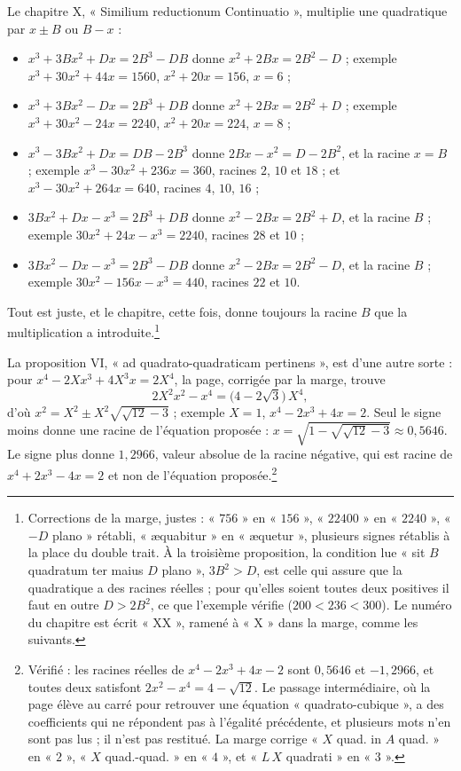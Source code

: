 \documentclass[11pt,a4paper]{article}
\begin{document}
Le chapitre X, « Similium reductionum Continuatio », multiplie une quadratique
par $x \pm B$ ou $B - x$ :
\begin{itemize}
  \item $x^3 + 3Bx^2 + Dx = 2B^3 - DB$ donne $x^2 + 2Bx = 2B^2 - D$ ; exemple
    $x^3 + 30x^2 + 44x = 1560$, $x^2 + 20x = 156$, $x = 6$ ;
  \item $x^3 + 3Bx^2 - Dx = 2B^3 + DB$ donne $x^2 + 2Bx = 2B^2 + D$ ; exemple
    $x^3 + 30x^2 - 24x = 2240$, $x^2 + 20x = 224$, $x = 8$ ;
  \item $x^3 - 3Bx^2 + Dx = DB - 2B^3$ donne $2Bx - x^2 = D - 2B^2$, et la racine
    $x = B$ ; exemple $x^3 - 30x^2 + 236x = 360$, racines $2$, $10$ et $18$ ; et
    $x^3 - 30x^2 + 264x = 640$, racines $4$, $10$, $16$ ;
  \item $3Bx^2 + Dx - x^3 = 2B^3 + DB$ donne $x^2 - 2Bx = 2B^2 + D$, et la racine
    $B$ ; exemple $30x^2 + 24x - x^3 = 2240$, racines $28$ et $10$ ;
  \item $3Bx^2 - Dx - x^3 = 2B^3 - DB$ donne $x^2 - 2Bx = 2B^2 - D$, et la racine
    $B$ ; exemple $30x^2 - 156x - x^3 = 440$, racines $22$ et $10$.
\end{itemize}
Tout est juste, et le chapitre, cette fois, donne toujours la racine $B$ que la
multiplication a introduite.\footnote{Corrections de la marge, justes : « $756$ »
en « $156$ », « $22400$ » en « $2240$ », « $- D$ plano » rétabli, « æquabitur » en
« æquetur », plusieurs signes rétablis à la place du double trait. À la troisième
proposition, la condition lue « sit $B$ quadratum ter maius $D$ plano »,
$3B^2 > D$, est celle qui assure que la quadratique a des racines réelles ; pour
qu'elles soient toutes deux positives il faut en outre $D > 2B^2$, ce que
l'exemple vérifie ($200 < 236 < 300$). Le numéro du chapitre est écrit « XX »,
ramené à « X » dans la marge, comme les suivants.}

La proposition VI, « ad quadrato-quadraticam pertinens », est d'une autre
sorte : pour $x^4 - 2Xx^3 + 4X^3x = 2X^4$, la page, corrigée par la marge, trouve
\[ 2X^2x^2 - x^4 = \bigl(4 - 2\sqrt3\bigr)\,X^4 , \]
d'où $x^2 = X^2 \pm X^2\sqrt{\sqrt{12} - 3}$ ; exemple $X = 1$,
$x^4 - 2x^3 + 4x = 2$. Seul le signe moins donne une racine de l'équation
proposée : $x = \sqrt{1 - \sqrt{\sqrt{12} - 3}} \approx 0{,}5646$. Le signe plus
donne $1{,}2966$, valeur absolue de la racine négative, qui est racine de
$x^4 + 2x^3 - 4x = 2$ et non de l'équation proposée.\footnote{Vérifié : les
racines réelles de $x^4 - 2x^3 + 4x - 2$ sont $0{,}5646$ et $-1{,}2966$, et toutes
deux satisfont $2x^2 - x^4 = 4 - \sqrt{12}$. Le passage intermédiaire, où la page
élève au carré pour retrouver une équation « quadrato-cubique », a des
coefficients qui ne répondent pas à l'égalité précédente, et plusieurs mots n'en
sont pas lus ; il n'est pas restitué. La marge corrige « $X$ quad. in $A$ quad. »
en « $2$ », « $X$ quad.-quad. » en « $4$ », et « $L\,X$ quadrati » en « $3$ ».}
\end{document}
